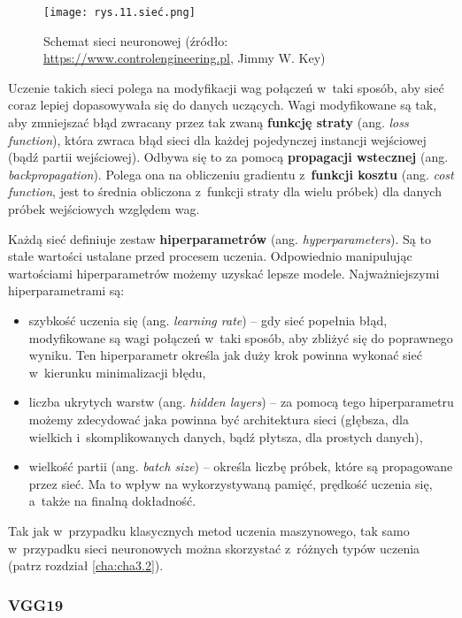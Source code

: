 \begin{figure}[h]
    \centering
    \texttt{[image: rys.11.sieć.png]}
    \caption{Schemat sieci neuronowej (źródło: \protect\url{https://www.controlengineering.pl}, Jimmy W. Key)}
    \label{fig:mesh11}
\end{figure}
Uczenie takich sieci polega na modyfikacji wag połączeń w~taki sposób, aby sieć coraz lepiej dopasowywała się do danych uczących. Wagi modyfikowane są tak, aby zmniejszać błąd zwracany przez tak zwaną \textbf{funkcję straty} (ang. \textit{loss function}), która zwraca błąd sieci dla każdej pojedynczej instancji wejściowej (bądź partii wejściowej). Odbywa się to za pomocą \textbf{propagacji wstecznej} (ang. \textit{backpropagation}). Polega ona na obliczeniu gradientu z~\textbf{funkcji kosztu} (ang. \textit{cost function}, jest to średnia obliczona z~funkcji straty dla wielu próbek) dla danych próbek wejściowych względem wag. 

Każdą sieć definiuje zestaw \textbf{hiperparametrów} (ang. \textit{hyperparameters}). Są to stałe wartości ustalane przed procesem uczenia. Odpowiednio manipulując wartościami hiperparametrów możemy uzyskać lepsze modele. Najważniejszymi hiperparametrami są:
\begin{itemize}
\item
szybkość uczenia się (ang. \textit{learning rate}) – gdy sieć popełnia błąd, modyfikowane są wagi połączeń w~taki sposób, aby zbliżyć się do poprawnego wyniku. Ten hiperparametr określa jak duży krok powinna wykonać sieć w~kierunku minimalizacji błędu,

\item
liczba ukrytych warstw (ang. \textit{hidden layers}) – za pomocą tego hiperparametru możemy zdecydować jaka powinna być architektura sieci (głębsza, dla wielkich i~skomplikowanych danych, bądź płytsza, dla prostych danych),

\item
wielkość partii (ang. \textit{batch size}) – określa liczbę próbek, które są propagowane przez sieć. Ma to wpływ na wykorzystywaną pamięć, prędkość uczenia się, a~także na finalną dokładność. 
\end{itemize}
\noindent Tak jak w~przypadku klasycznych metod uczenia maszynowego, tak samo w~przypadku sieci neuronowych można skorzystać z~różnych typów uczenia (patrz rozdział \ref{cha:cha3.2}). 

\subsubsection{VGG19}
\label{cha:VGG19}

